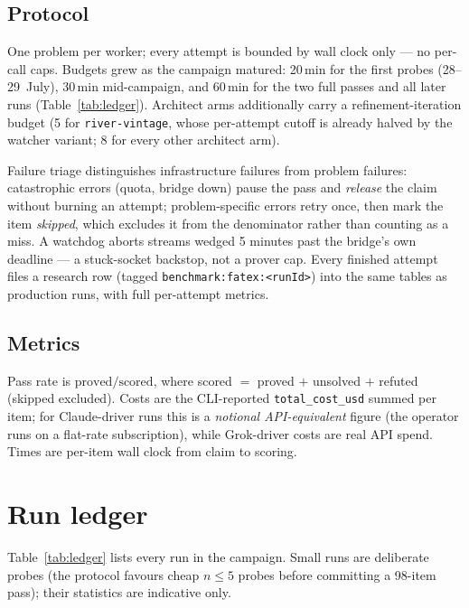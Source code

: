 \documentclass[12pt, a4paper]{article}
\newcommand{\run}[1]{\texttt{#1}}
\begin{document}
\subsection{Protocol}
\label{sec:protocol}

One problem per worker; every attempt is bounded by wall clock only --- no
per-call caps. Budgets grew as the campaign matured: 20\,min for the first
probes (28--29~July), 30\,min mid-campaign, and 60\,min for the two full passes
and all later runs (Table~\ref{tab:ledger}). Architect arms additionally carry
a refinement-iteration budget (5 for \run{river-vintage}, whose per-attempt
cutoff is already halved by the watcher variant; 8 for every other architect
arm).

Failure triage distinguishes infrastructure failures from problem failures:
catastrophic errors (quota, bridge down) pause the pass and \emph{release} the
claim without burning an attempt; problem-specific errors retry once, then mark
the item \emph{skipped}, which excludes it from the denominator rather than
counting as a miss. A watchdog aborts streams wedged 5 minutes past the
bridge's own deadline --- a stuck-socket backstop, not a prover cap. Every
finished attempt files a research row (tagged
\run{benchmark:fatex:<runId>}) into the same tables as production runs,
with full per-attempt metrics.

\subsection{Metrics}

Pass rate is $\text{proved}/\text{scored}$, where scored $=$ proved $+$
unsolved $+$ refuted (skipped excluded). Costs are the CLI-reported
\texttt{total\_cost\_usd} summed per item; for Claude-driver runs this is a
\emph{notional API-equivalent} figure (the operator runs on a flat-rate
subscription), while Grok-driver costs are real API spend. Times are
per-item wall clock from claim to scoring.

\section{Run ledger}

Table~\ref{tab:ledger} lists every run in the campaign. Small runs are
deliberate probes (the protocol favours cheap $n{\le}5$ probes before
committing a 98-item pass); their statistics are indicative only.
\end{document}

